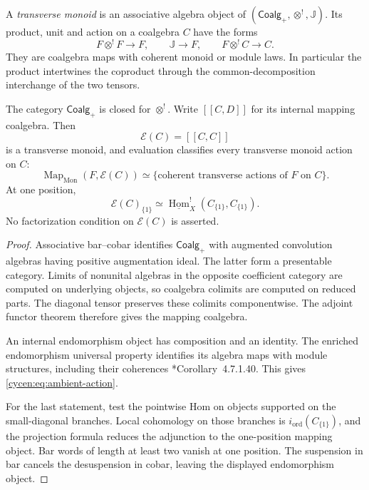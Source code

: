 A \emph{transverse monoid} is an associative algebra object
of $(\mathsf{Coalg}_+,\otimes^!,\mathbb J)$. Its product,
unit and action on a coalgebra $C$ have the forms
\[
 F\otimes^!F\longrightarrow F,
 \qquad \mathbb J\longrightarrow F,
 \qquad F\otimes^!C\longrightarrow C.
\]
They are coalgebra maps with coherent monoid or module laws.
In particular the product intertwines the coproduct through
the common-decomposition interchange of the two tensors.

\begin{theorem}\label{cycen:thm:ambient}
The category $\mathsf{Coalg}_+$ is closed for $\otimes^!$.
Write $[\![C,D]\!]$ for its internal mapping coalgebra. Then
\[
 \mathcal E(C)=[\![C,C]\!]
\]
is a transverse monoid, and evaluation classifies every
transverse monoid action on $C$:
\begin{equation}\label{cycen:eq:ambient-action}
 \operatorname{Map}_{\mathrm{Mon}}(F,\mathcal E(C))
 \simeq\{\text{coherent transverse actions of }F\text{ on }C\}.
\end{equation}
At one position,
\[
 \mathcal E(C)_{\{1\}}
 \simeq\underline{\operatorname{Hom}}_X^!
                    (C_{\{1\}},C_{\{1\}}).
\]
No factorization condition on $\mathcal E(C)$ is asserted.
\end{theorem}
\begin{proof}
Associative bar--cobar identifies $\mathsf{Coalg}_+$ with
augmented convolution algebras having positive augmentation
ideal. The latter form a presentable category. Limits of
nonunital algebras in the opposite coefficient category are
computed on underlying objects, so coalgebra colimits are
computed on reduced parts. The diagonal tensor preserves
these colimits componentwise. The adjoint functor theorem
therefore gives the mapping coalgebra.

An internal endomorphism object has composition and an identity.
The enriched endomorphism universal property identifies its
algebra maps with module structures, including their coherences
\cite{LurieHA}*{Corollary~4.7.1.40}. This gives
\eqref{cycen:eq:ambient-action}.

For the last statement, test the pointwise Hom on objects
supported on the small-diagonal branches. Local cohomology on
those branches is $i_{\mathrm{ord}}(C_{\{1\}})$, and the
projection formula reduces the adjunction to the one-position
mapping object. Bar words of length at least two vanish at
one position. The suspension in bar cancels the desuspension
in cobar, leaving the displayed endomorphism object.
\end{proof}

